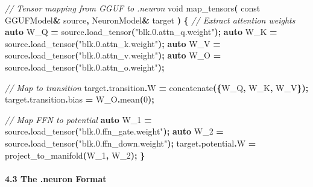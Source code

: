 \documentclass[
  11pt,
  a4paper,
]{article}
\newenvironment{Shaded}{\begin{snugshade}}{\end{snugshade}}
\newcommand{\AttributeTok}[1]{\textcolor[rgb]{0.13,0.29,0.53}{#1}}
\newcommand{\CommentTok}[1]{\textcolor[rgb]{0.56,0.35,0.01}{\textit{#1}}}
\newcommand{\DataTypeTok}[1]{\textcolor[rgb]{0.13,0.29,0.53}{#1}}
\newcommand{\DecValTok}[1]{\textcolor[rgb]{0.00,0.00,0.81}{#1}}
\newcommand{\KeywordTok}[1]{\textcolor[rgb]{0.13,0.29,0.53}{\textbf{#1}}}
\newcommand{\NormalTok}[1]{#1}
\newcommand{\OperatorTok}[1]{\textcolor[rgb]{0.81,0.36,0.00}{\textbf{#1}}}
\newcommand{\StringTok}[1]{\textcolor[rgb]{0.31,0.60,0.02}{#1}}
\begin{document}
\begin{Shaded}
\begin{Highlighting}[]
\CommentTok{// Tensor mapping from GGUF to .neuron}
\DataTypeTok{void}\NormalTok{ map\_tensors}\OperatorTok{(}
    \AttributeTok{const}\NormalTok{ GGUFModel}\OperatorTok{\&}\NormalTok{ source}\OperatorTok{,}
\NormalTok{    NeuronModel}\OperatorTok{\&}\NormalTok{ target}
\OperatorTok{)} \OperatorTok{\{}
    \CommentTok{// Extract attention weights}
    \KeywordTok{auto}\NormalTok{ W\_Q }\OperatorTok{=}\NormalTok{ source}\OperatorTok{.}\NormalTok{load\_tensor}\OperatorTok{(}\StringTok{"blk.0.attn\_q.weight"}\OperatorTok{);}
    \KeywordTok{auto}\NormalTok{ W\_K }\OperatorTok{=}\NormalTok{ source}\OperatorTok{.}\NormalTok{load\_tensor}\OperatorTok{(}\StringTok{"blk.0.attn\_k.weight"}\OperatorTok{);}
    \KeywordTok{auto}\NormalTok{ W\_V }\OperatorTok{=}\NormalTok{ source}\OperatorTok{.}\NormalTok{load\_tensor}\OperatorTok{(}\StringTok{"blk.0.attn\_v.weight"}\OperatorTok{);}
    \KeywordTok{auto}\NormalTok{ W\_O }\OperatorTok{=}\NormalTok{ source}\OperatorTok{.}\NormalTok{load\_tensor}\OperatorTok{(}\StringTok{"blk.0.attn\_o.weight"}\OperatorTok{);}
    
    \CommentTok{// Map to transition}
\NormalTok{    target}\OperatorTok{.}\NormalTok{transition}\OperatorTok{.}\NormalTok{W }\OperatorTok{=}\NormalTok{ concatenate}\OperatorTok{(\{}\NormalTok{W\_Q}\OperatorTok{,}\NormalTok{ W\_K}\OperatorTok{,}\NormalTok{ W\_V}\OperatorTok{\});}
\NormalTok{    target}\OperatorTok{.}\NormalTok{transition}\OperatorTok{.}\NormalTok{bias }\OperatorTok{=}\NormalTok{ W\_O}\OperatorTok{.}\NormalTok{mean}\OperatorTok{(}\DecValTok{0}\OperatorTok{);}
    
    \CommentTok{// Map FFN to potential}
    \KeywordTok{auto}\NormalTok{ W\_1 }\OperatorTok{=}\NormalTok{ source}\OperatorTok{.}\NormalTok{load\_tensor}\OperatorTok{(}\StringTok{"blk.0.ffn\_gate.weight"}\OperatorTok{);}
    \KeywordTok{auto}\NormalTok{ W\_2 }\OperatorTok{=}\NormalTok{ source}\OperatorTok{.}\NormalTok{load\_tensor}\OperatorTok{(}\StringTok{"blk.0.ffn\_down.weight"}\OperatorTok{);}
\NormalTok{    target}\OperatorTok{.}\NormalTok{potential}\OperatorTok{.}\NormalTok{W }\OperatorTok{=}\NormalTok{ project\_to\_manifold}\OperatorTok{(}\NormalTok{W\_1}\OperatorTok{,}\NormalTok{ W\_2}\OperatorTok{);}
\OperatorTok{\}}
\end{Highlighting}
\end{Shaded}

\paragraph{4.3 The .neuron Format}\label{the-.neuron-format}
\end{document}
